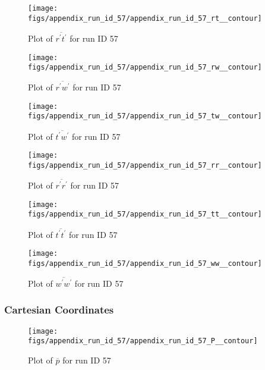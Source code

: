 \begin{figure}[H]
\centering
\texttt{[image: figs/appendix\_run\_id\_57/appendix\_run\_id\_57\_rt\_\_contour]}
\caption{Plot of $\overline{r^\prime t^\prime}$ for run ID 57}
\label{fig:appendix_run_id_57_rt__contour}
\end{figure}


\begin{figure}[H]
\centering
\texttt{[image: figs/appendix\_run\_id\_57/appendix\_run\_id\_57\_rw\_\_contour]}
\caption{Plot of $\overline{r^\prime w^\prime}$ for run ID 57}
\label{fig:appendix_run_id_57_rw__contour}
\end{figure}


\begin{figure}[H]
\centering
\texttt{[image: figs/appendix\_run\_id\_57/appendix\_run\_id\_57\_tw\_\_contour]}
\caption{Plot of $\overline{t^\prime w^\prime}$ for run ID 57}
\label{fig:appendix_run_id_57_tw__contour}
\end{figure}


\begin{figure}[H]
\centering
\texttt{[image: figs/appendix\_run\_id\_57/appendix\_run\_id\_57\_rr\_\_contour]}
\caption{Plot of $\overline{r^\prime r^\prime}$ for run ID 57}
\label{fig:appendix_run_id_57_rr__contour}
\end{figure}


\begin{figure}[H]
\centering
\texttt{[image: figs/appendix\_run\_id\_57/appendix\_run\_id\_57\_tt\_\_contour]}
\caption{Plot of $\overline{t^\prime t^\prime}$ for run ID 57}
\label{fig:appendix_run_id_57_tt__contour}
\end{figure}


\begin{figure}[H]
\centering
\texttt{[image: figs/appendix\_run\_id\_57/appendix\_run\_id\_57\_ww\_\_contour]}
\caption{Plot of $\overline{w^\prime w^\prime}$ for run ID 57}
\label{fig:appendix_run_id_57_ww__contour}
\end{figure}


\subsubsection{Cartesian Coordinates}
\begin{figure}[H]
\centering
\texttt{[image: figs/appendix\_run\_id\_57/appendix\_run\_id\_57\_P\_\_contour]}
\caption{Plot of $\overline{p}$ for run ID 57}
\label{fig:appendix_run_id_57_P__contour}
\end{figure}


